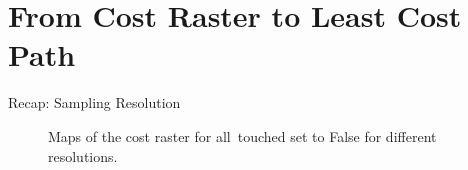 \documentclass[usenames,dvipsnames,aspectratio=169]{beamer}
\begin{document}
	\section{From Cost Raster to Least Cost Path}
	\begin{frame}{Recap: Sampling Resolution}
		\begin{figure}
		\centering
		\enskip
		\enskip
		
		\caption{Maps of the cost raster for all~touched set to False for different resolutions.}
		\label{fig:CostAllTouchedFalse}
		\end{figure}
	\end{frame}
\end{document}
